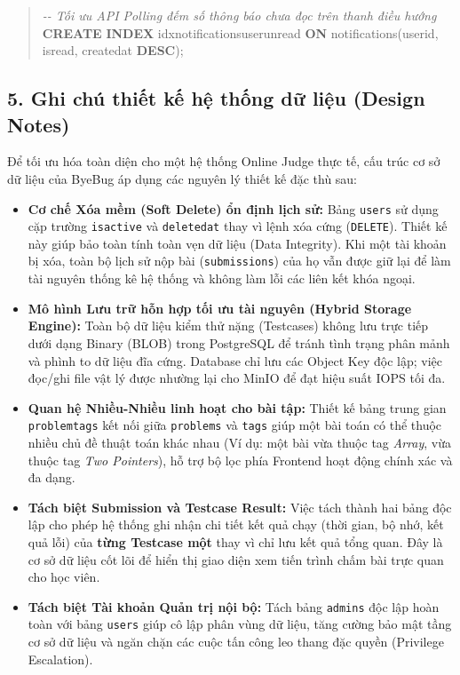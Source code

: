 \documentclass[12pt,a4paper]{article}
\renewcommand{\_}{\BreakableUnderscore}
\newenvironment{Shaded}{\vspace{3pt}\begin{quote}}{\end{quote}\vspace{3pt}}
\newcommand{\CommentTok}[1]{\textcolor[rgb]{0.38,0.63,0.69}{\textit{#1}}}
\newcommand{\KeywordTok}[1]{\textcolor[rgb]{0.00,0.44,0.13}{\textbf{#1}}}
\newcommand{\NormalTok}[1]{#1}
\begin{document}
\begin{Shaded}
\begin{Highlighting}[]
\CommentTok{{-}{-} Tối ưu API Polling đếm số thông báo chưa đọc trên thanh điều hướng}
\KeywordTok{CREATE} \KeywordTok{INDEX}\NormalTok{ idx\_notifications\_user\_unread }\KeywordTok{ON}\NormalTok{ notifications(user\_id, is\_read, created\_at }\KeywordTok{DESC}\NormalTok{);}
\end{Highlighting}
\end{Shaded}

\subsection{5. Ghi chú thiết kế hệ thống dữ liệu (Design Notes)}

Để tối ưu hóa toàn diện cho một hệ thống Online Judge thực tế, cấu trúc cơ sở dữ liệu của ByeBug áp dụng các nguyên lý thiết kế đặc thù sau:

\begin{itemize}
\item
  \textbf{Cơ chế Xóa mềm (Soft Delete) ổn định lịch sử:} Bảng \texttt{users} sử dụng cặp trường \texttt{is\_active} và \texttt{deleted\_at} thay vì lệnh xóa cứng (\texttt{DELETE}). Thiết kế này giúp bảo toàn tính toàn vẹn dữ liệu (Data Integrity). Khi một tài khoản bị xóa, toàn bộ lịch sử nộp bài (\texttt{submissions}) của họ vẫn được giữ lại để làm tài nguyên thống kê hệ thống và không làm lỗi các liên kết khóa ngoại.
\item
  \textbf{Mô hình Lưu trữ hỗn hợp tối ưu tài nguyên (Hybrid Storage Engine):} Toàn bộ dữ liệu kiểm thử nặng (Testcases) không lưu trực tiếp dưới dạng Binary (BLOB) trong PostgreSQL để tránh tình trạng phân mảnh và phình to dữ liệu đĩa cứng. Database chỉ lưu các Object Key độc lập; việc đọc/ghi file vật lý được nhường lại cho MinIO để đạt hiệu suất IOPS tối đa.
\item
  \textbf{Quan hệ Nhiều-Nhiều linh hoạt cho bài tập:} Thiết kế bảng trung gian \texttt{problem\_tags} kết nối giữa \texttt{problems} và \texttt{tags} giúp một bài toán có thể thuộc nhiều chủ đề thuật toán khác nhau (Ví dụ: một bài vừa thuộc tag \emph{Array}, vừa thuộc tag \emph{Two Pointers}), hỗ trợ bộ lọc phía Frontend hoạt động chính xác và đa dạng.
\item
  \textbf{Tách biệt Submission và Testcase Result:} Việc tách thành hai bảng độc lập cho phép hệ thống ghi nhận chi tiết kết quả chạy (thời gian, bộ nhớ, kết quả lỗi) của \textbf{từng Testcase một} thay vì chỉ lưu kết quả tổng quan. Đây là cơ sở dữ liệu cốt lõi để hiển thị giao diện xem tiến trình chấm bài trực quan cho học viên.
\item
  \textbf{Tách biệt Tài khoản Quản trị nội bộ:} Tách bảng \texttt{admins} độc lập hoàn toàn với bảng \texttt{users} giúp cô lập phân vùng dữ liệu, tăng cường bảo mật tầng cơ sở dữ liệu và ngăn chặn các cuộc tấn công leo thang đặc quyền (Privilege Escalation).
\end{itemize}
\end{document}
